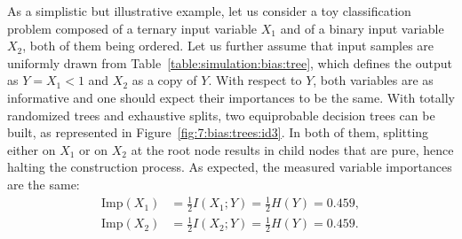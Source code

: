 As a simplistic but illustrative example, let us consider a toy classification
problem composed of a ternary input variable $X_1$ and of a binary input
variable $X_2$, both of them being ordered. Let us further assume that input samples are uniformly drawn
from Table~\ref{table:simulation:bias:tree}, which defines the output as $Y =
X_1 < 1$ and $X_2$ as a copy of $Y$. With respect to $Y$, both variables are as
informative and one should expect their importances to be the same.  With
totally randomized trees and exhaustive splits, two equiprobable decision trees
can be built, as represented in Figure~\ref{fig:7:bias:trees:id3}. In both of
them, splitting either on $X_1$ or on $X_2$ at the root node results in child
nodes that are pure, hence halting the construction process. As expected, the measured
variable importances are the same:
\begin{align*}
\text{Imp}(X_1) &= \frac{1}{2} I(X_1;Y) = \frac{1}{2} H(Y) = 0.459, \\
\text{Imp}(X_2) &= \frac{1}{2} I(X_2;Y) = \frac{1}{2} H(Y) = 0.459.
\end{align*}

